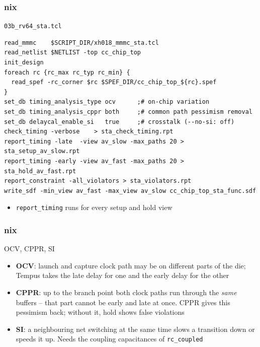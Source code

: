 \documentclass{beamer}
\newcommand{\astitle}{nix}
\newcommand{\assubtitle}{nix}
\newcommand{\cmd}[1]{\texttt{#1}}
\begin{document}
\renewcommand{\assubtitle}{\texttt{03b\_rv64\_sta.tcl}}
\begin{frame}[fragile]
\frametitle{\astitle}
\begin{block}{\assubtitle}
\begin{lstlisting}[style=sh]
read_mmmc    $SCRIPT_DIR/xh018_mmmc_sta.tcl
read_netlist $NETLIST -top cc_chip_top
init_design
foreach rc {rc_max rc_typ rc_min} {
  read_spef -rc_corner $rc $SPEF_DIR/cc_chip_top_${rc}.spef
}
set_db timing_analysis_type ocv      ;# on-chip variation
set_db timing_analysis_cppr both     ;# common path pessimism removal
set_db delaycal_enable_si   true     ;# crosstalk (--no-si: off)
check_timing -verbose    > sta_check_timing.rpt
report_timing -late  -view av_slow -max_paths 20 > sta_setup_av_slow.rpt
report_timing -early -view av_fast -max_paths 20 > sta_hold_av_fast.rpt
report_constraint -all_violators > sta_violators.rpt
write_sdf -min_view av_fast -max_view av_slow cc_chip_top_sta_func.sdf
\end{lstlisting}
  \scriptsize
  \begin{itemize}
    \item \cmd{report\_timing} runs for every setup and hold view
  \end{itemize}
\end{block}
\end{frame}

\renewcommand{\assubtitle}{OCV, CPPR, SI}
\begin{frame}
\frametitle{\astitle}
\begin{block}{\assubtitle}
  \begin{itemize}
    \item \textbf{OCV}: launch and capture clock path may be on
      different parts of the die; Tempus takes the late delay for one and
      the early delay for the other
    \item \textbf{CPPR}: up to the branch point both clock paths run
      through the \emph{same} buffers -- that part cannot be early and
      late at once. CPPR gives this pessimism back; without it, hold
      shows false violations
    \item \textbf{SI}: a neighbouring net switching at the same time
      slows a transition down or speeds it up. Needs the coupling
      capacitances of \cmd{rc\_coupled}
  \end{itemize}
\end{block}
\end{frame}
\end{document}
